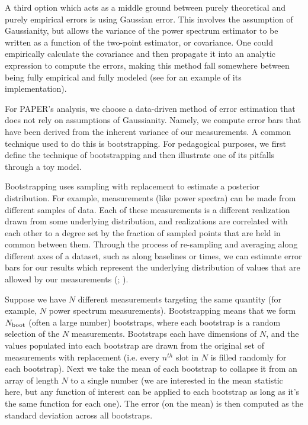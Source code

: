 \documentclass[preprint2,numberedappendix,tighten]{aastex6}  %
\begin{document}
A third option which acts as a middle ground between purely theoretical and purely empirical errors is using Gaussian error. This involves the assumption of Gaussianity, but allows the variance of the power spectrum estimator to be written as a function of the two-point estimator, or covariance. One could empirically calculate the covariance and then propagate it into an analytic expression to compute the errors, making this method fall somewhere between being fully empirical and fully modeled (see \citet{das_et_al2011a} for an example of its implementation). 

For PAPER's analysis, we choose a data-driven method of error estimation that does not rely on assumptions of Gaussianity. Namely, we compute error bars that have been derived from the inherent 
variance of our measurements. A common technique used to do this is bootstrapping. For pedagogical purposes, we first define the technique of 
bootstrapping and then illustrate one of its pitfalls through a toy model.

Bootstrapping uses sampling with replacement to estimate a posterior distribution. For example, measurements (like power 
spectra) can be made from different samples of data. Each of these measurements is a different realization drawn from some underlying distribution, and realizations are correlated with each other to a degree set by the fraction of sampled points that are held in common 
between them. Through the process of re-sampling and averaging along different axes of a dataset, such as along baselines or times, we can estimate error bars for 
our results which represent the underlying distribution of values that are allowed by our measurements (\citealt{efron_tibshirani1994}; \citealt{andrae2010}).

Suppose we have $N$ different measurements targeting the same quantity (for example, $N$ power spectrum measurements). 
Bootstrapping means that we form $N_{\rm boot}$ (often a large number) bootstraps, where each bootstrap is a random selection 
of the $N$ measurements. Bootstraps each have dimensions of $N$, and the values populated into each bootstrap are drawn 
from the original set of measurements with replacement (i.e. every $n^{th}$ slot in $N$ is filled randomly for each bootstrap). Next we take 
the mean of each bootstrap to collapse it from an array of length $N$ to a single number (we are interested in the mean statistic 
here, but any function of interest can be applied to each bootstrap as long as it's the same function for each one). The error (on 
the mean) is then computed as the standard deviation across all bootstraps. 
\end{document}
